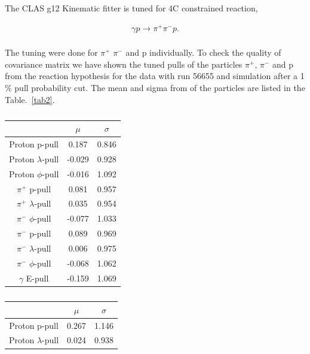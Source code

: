 \documentclass[12pt,a4paper]{amsbook}
\theoremstyle{definition}
\begin{document}
The CLAS g12 Kinematic fitter is tuned for 4C constrained reaction,

\begin{eqnarray*}
\gamma p \rightarrow \pi^{+} \pi^{-} p.
\end{eqnarray*}\\
\noindent
The tuning were done for $\pi^{+}$ $\pi^{-}$ and p individually. To check the quality of covariance matrix we have shown the tuned pulls of the particles $\pi^{+}$, $\pi^{-}$ and p from the reaction hypothesis for the data with run 56655 and simulation after a 1$\%$ pull probability cut. The mean and sigma from of the particles are listed in the Table.~\ref{tab2}.

\begin{table}
\centering
\begin{subtable}{.5\textwidth}
\centering
\caption{ }
\begin{tabular}{ |c|c|c| }
\hline
                                                &$\mu$   &$\sigma$ \\
                               \hline
Proton p-pull                            & 0.187  & 0.846  \\
\hline
Proton $\lambda$-pull                      & -0.029 & 0.928  \\
\hline
Proton $\phi$-pull                         & -0.016 & 1.092  \\
\hline
$\pi^{+}$ p-pull        & 0.081  & 0.957  \\
\hline
$\pi^{+}$ $\lambda$-pull & 0.035  & 0.954  \\
\hline
$\pi^{-}$ $\phi$-pull    & -0.077 & 1.033  \\
\hline
$\pi^{-}$ p-pull        & 0.089  & 0.969  \\
\hline
$\pi^{-}$ $\lambda$-pull & 0.006  & 0.975  \\
\hline
$\pi^{-}$ $\phi$-pull    & -0.068 & 1.062  \\
\hline
$\gamma$ E-pull   & -0.159 & 1.069 \\
\hline
\end{tabular}
\end{subtable}%
\begin{subtable}{.5\textwidth}
\centering
\caption{ }
\begin{tabular}{ |c|c|c| }
\hline
                                         &$\mu$   &$\sigma$ \\ \hline
Proton p-pull                             & 0.267  & 1.146  \\
\hline
Proton $\lambda$-pull                  & 0.024  & 0.938  \\

\end{tabular}
\end{subtable}
\end{table}
\end{document}
